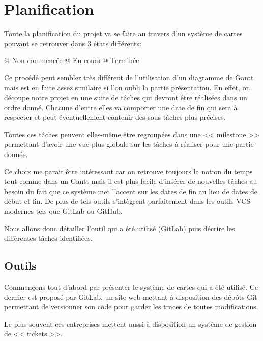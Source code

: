 \documentclass[final]{polytech/polytech}
\begin{document}
\chapter{Planification\label{sec:plannification}}
	Toute la planification du projet va se faire au travers d'un système de cartes pouvant se retrouver dans 3 états différents:
	\begin{easylist}
		@ Non commencée
		@ En cours
		@ Terminée	
	\end{easylist}
	
	Ce procédé peut sembler très différent de l'utilisation d'un diagramme de Gantt mais est en faite assez similaire si l'on oubli la partie présentation.
	En effet, on découpe notre projet en une suite de tâches qui devront être réalisées dans un ordre donné. Chacune d'entre elles va comporter une date de fin qui sera à respecter et peut éventuellement contenir des sous-tâches plus précises.
	
	Toutes ces tâches peuvent elles-même être regroupées dans une << milestone >> permettant d'avoir une vue plus globale sur les tâches à réaliser pour une partie donnée.
	
	Ce choix me parait être intéressant car on retrouve toujours la notion du temps tout comme dans un Gantt mais il est plus facile d'insérer de nouvelles tâches au besoin du fait que ce système met l'accent sur les dates de fin au lieu de dates de début et fin.
	De plus de tels outils s'intègrent parfaitement dans les outils VCS modernes tels que GitLab ou GitHub.
	
	Nous allons donc détailler l'outil qui a été utilisé (GitLab) puis décrire les différentes tâches identifiées.

	\section{Outils\label{sec:issues}}
		Commençons tout d'abord par présenter le système de cartes qui a été utilisé.
		Ce dernier est proposé par GitLab, un site web mettant à disposition des dépôts Git permettant de versionner son code pour garder les traces de toutes modifications.
		
		Le plus souvent ces entreprises mettent aussi à disposition un système de gestion de << tickets >>.
		
		
\end{document}
